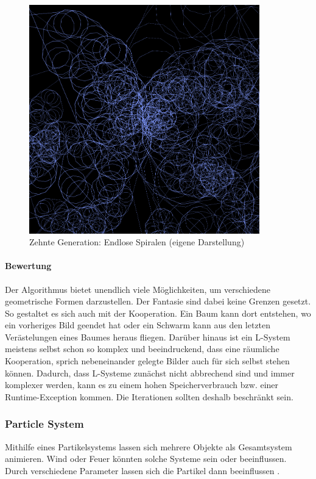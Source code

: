 \documentclass[../mciAusarbeitung.tex]{subfiles}
\begin{document}
\begin{figure}[H]
\includegraphics[width=10cm]{img/sierpinski-gen10.png}
\caption{Zehnte Generation: Endlose Spiralen (eigene Darstellung)}
\label{sierpinski-gen10}
\end{figure}

\paragraph{Bewertung}
Der Algorithmus bietet unendlich viele Möglichkeiten, um verschiedene geometrische Formen darzustellen. Der Fantasie sind dabei keine Grenzen gesetzt. So gestaltet es sich auch mit der Kooperation. Ein Baum kann dort entstehen, wo ein vorheriges Bild geendet hat oder ein Schwarm kann aus den letzten Verästelungen eines Baumes heraus fliegen. Darüber hinaus ist ein L-System meistens selbst schon so komplex und beeindruckend, dass eine räumliche Kooperation, sprich nebeneinander gelegte Bilder auch für sich selbst stehen können.
Dadurch, dass L-Systeme zunächst nicht abbrechend sind und immer komplexer werden, kann es zu einem hohen Speicherverbrauch bzw. einer Runtime-Exception kommen. Die Iterationen sollten deshalb beschränkt sein.


\subsubsection{Particle System}
Mithilfe eines Partikelsystems lassen sich mehrere Objekte als Gesamtsystem animieren. Wind oder Feuer könnten solche Systeme sein oder beeinflussen. Durch verschiedene Parameter lassen sich die Partikel dann beeinflussen \cite{reeves1983particle}.
\end{document}
